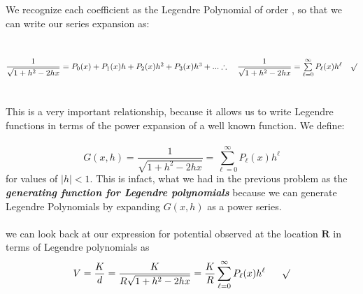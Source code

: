 \documentclass[fleqn]{article}
\begin{document}
\begin{enumerate}
{      \\
      \\
      We recognize each coefficient as the Legendre Polynomial of order , so that we can write our series expansion as: \\
      \\
      \\
      $
        \dfrac{1}{\sqrt{1+h^2-2hx}}=P_0(x)+P_1(x)h+P_2(x)h^2+P_3(x) h^3+... \\
        \\
        \\
        \therefore ~~~ \dfrac{1}{\sqrt{1+h^2-2hx}}=\sum\limits_{\ell=0}^{\infty} P_{\ell}(x) h^{\ell} ~~~ \surd
      $ \\
      \\
      \\
      This is a very important relationship, because it allows us to write Legendre functions in
      terms of the power expansion of a well known function. We define: \\
      \\
      $$G(x,h)=\dfrac{1}{\sqrt{1+h^2-2hx}}=\sum\limits_{\ell=0}^{\infty} P_{\ell}(x) h^{\ell}$$
      for values of $|h|<1$. This is infact, what we had in the previous problem as the 
      \emph{\textbf{generating function for Legendre polynomials}} because we can
      generate Legendre Polynomials by expanding $G(x,h)$ as a power series. \\
      \\
      we can look back at our expression for potential observed at the location $\mathbf{R}$ in terms
      of Legendre polynomials as
      $$V=\dfrac{K}{d}=\dfrac{K}{R\sqrt{1+h^2-2hx}}=\dfrac{K}{R} \sum\limits_{\ell=0}^{\infty} P_{\ell}(x) h^{\ell} ~~~~~ \surd$$
    }

  \end{enumerate}

  \pagebreak
\end{document}
